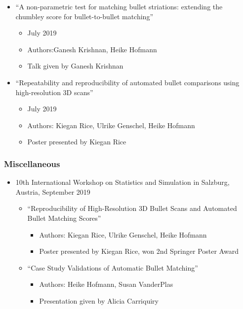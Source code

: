 \documentclass[]{book}
\providecommand{\tightlist}{%
  \setlength{\itemsep}{0pt}\setlength{\parskip}{0pt}}
\begin{document}
\begin{itemize}
\tightlist
\item
  ``A non-parametric test for matching bullet striations: extending the chumbley score for bullet-to-bullet matching''

  \begin{itemize}
  \tightlist
  \item
    July 2019
  \item
    Authors:Ganesh Krishnan, Heike Hofmann
  \item
    Talk given by Ganesh Krishnan
  \end{itemize}
\item
  ``Repeatability and reproducibility of automated bullet comparisons using high-resolution 3D scans''

  \begin{itemize}
  \tightlist
  \item
    July 2019
  \item
    Authors: Kiegan Rice, Ulrike Genschel, Heike Hofmann
  \item
    Poster presented by Kiegan Rice
  \end{itemize}
\end{itemize}

\hypertarget{miscellaneous}{%
\subsubsection{Miscellaneous}\label{miscellaneous}}

\begin{itemize}
\tightlist
\item
  10th International Workshop on Statistics and Simulation in Salzburg, Austria, September 2019

  \begin{itemize}
  \tightlist
  \item
    ``Reproducibility of High-Resolution 3D Bullet Scans and Automated Bullet Matching Scores''

    \begin{itemize}
    \tightlist
    \item
      Authors: Kiegan Rice, Ulrike Genschel, Heike Hofmann
    \item
      Poster presented by Kiegan Rice, won 2nd Springer Poster Award\\
    \end{itemize}
  \item
    ``Case Study Validations of Automatic Bullet Matching''

    \begin{itemize}
    \tightlist
    \item
      Authors: Heike Hofmann, Susan VanderPlas
    \item
      Presentation given by Alicia Carriquiry
    \end{itemize}
  \end{itemize}
\end{itemize}
\end{document}
